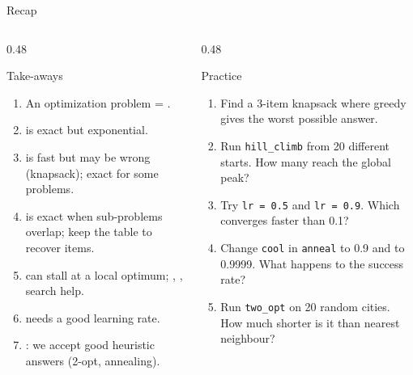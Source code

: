 \documentclass[aspectratio=169,10pt]{beamer}
\begin{document}
\begin{frame}{Recap}
\begin{columns}[T]
\begin{column}{0.48\textwidth}
\begin{block}{Take-aways}
{\small
\begin{enumerate}\setlength\itemsep{1pt}
\item An optimization problem = .
\item {} is exact but exponential.
\item {} is fast but may be wrong (knapsack); exact for some problems.
\item {} is exact when sub-problems overlap; keep the table to recover items.
\item {} can stall at a local optimum; , ,  search help.
\item {} needs a good learning rate.
\item {}: we accept good heuristic answers (2-opt, annealing).
\end{enumerate}}
\end{block}
\end{column}
\begin{column}{0.48\textwidth}
\begin{block}{Practice}
{\small
\begin{enumerate}\setlength\itemsep{3pt}
\item Find a 3-item knapsack where greedy gives the worst possible answer.
\item Run \texttt{hill\_climb} from 20 different starts. How many reach the global peak?
\item Try \texttt{lr = 0.5} and \texttt{lr = 0.9}. Which converges faster than 0.1?
\item Change \texttt{cool} in \texttt{anneal} to 0.9 and to 0.9999. What happens to the success rate?
\item Run \texttt{two\_opt} on 20 random cities. How much shorter is it than nearest neighbour?
\end{enumerate}}
\end{block}
\end{column}
\end{columns}
\end{frame}
\end{document}
